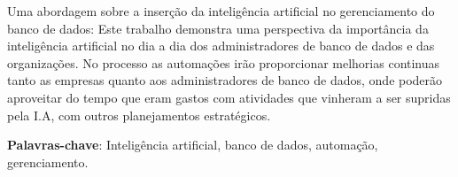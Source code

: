 \documentclass[
	12pt,
	openright,		
	twoside,
	a4paper,
	english,
	brazil,
	]{abntex2}
\begin{document}
\frenchspacing 				%

\pretextual

\imprimircapa
\imprimirfolhaderosto

\setlength{\absparsep}{18pt} %
\begin{resumo}

Uma abordagem sobre a inserção da inteligência artificial no gerenciamento do banco de dados: Este trabalho demonstra uma perspectiva da importância da inteligência artificial no dia a dia dos administradores de banco de dados e das organizações. No processo as automações irão proporcionar melhorias continuas tanto as empresas quanto aos administradores de banco de dados, onde poderão aproveitar do tempo que eram gastos com atividades que vinheram a ser supridas pela I.A, com outros planejamentos estratégicos.

\textbf{Palavras-chave}: Inteligência artificial, banco de dados, automação, gerenciamento.

\end{resumo}


\tableofcontents*
\cleardoublepage

\textual






\postextual

\end{document}
